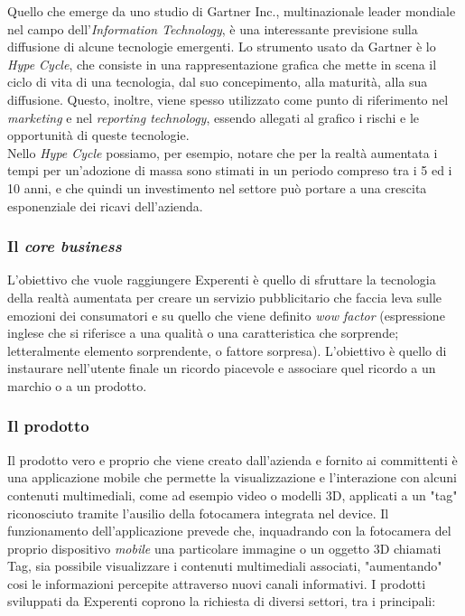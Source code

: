 Quello che emerge da uno studio di Gartner Inc., multinazionale leader mondiale nel campo dell’\textit{Information Technology}, è una interessante previsione sulla diffusione di alcune tecnologie emergenti. Lo strumento usato da Gartner è lo \textit{Hype Cycle}, che consiste in una rappresentazione grafica che mette in scena il ciclo di vita di una tecnologia, dal suo concepimento, alla maturità, alla sua diffusione. Questo, inoltre, viene spesso utilizzato come punto di riferimento nel \textit{marketing} e nel \textit{reporting technology}, essendo allegati al grafico i rischi e le opportunità di queste tecnologie.
\\
Nello \textit{Hype Cycle} possiamo, per esempio, notare che per la realt\`a aumentata i tempi per un’adozione di massa sono stimati in un periodo compreso tra i 5 ed i 10 anni, e che quindi un investimento nel settore pu\`o portare a una crescita esponenziale dei ricavi dell'azienda. 

\subsubsection{Il \textit{core business\gloss}}
L'obiettivo che vuole raggiungere Experenti \`e quello di sfruttare la tecnologia della realt\`a aumentata per creare un servizio pubblicitario che faccia leva sulle emozioni dei consumatori e su quello che viene definito \textit{wow factor} (espressione inglese che si riferisce a una qualit\`a o una caratteristica che sorprende; letteralmente elemento sorprendente, o fattore sorpresa). L'obiettivo \`e quello di instaurare nell'utente finale un ricordo piacevole e associare quel ricordo a un marchio o a un prodotto.

\subsubsection{Il prodotto}
Il prodotto vero e proprio che viene creato dall'azienda e fornito ai committenti \`e una applicazione mobile che permette la visualizzazione e l'interazione con alcuni contenuti multimediali, come ad esempio video o modelli 3D, applicati a un "tag" riconosciuto tramite l'ausilio della fotocamera integrata nel device.
Il funzionamento dell'applicazione prevede che, inquadrando con la fotocamera del proprio dispositivo \textit{mobile} una particolare immagine o un oggetto 3D chiamati Tag, sia possibile visualizzare i contenuti multimediali associati, "aumentando" cosi le informazioni percepite attraverso nuovi canali informativi.
I prodotti sviluppati da Experenti coprono la richiesta di diversi settori, tra i principali:

